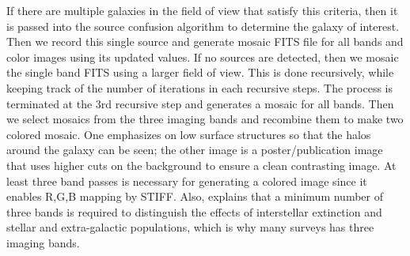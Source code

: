 \documentclass[authoryear, 12pt,5p, times]{elsarticle}
\begin{document}
If there are multiple galaxies in the field of view that satisfy this criteria, then it is passed into the source confusion algorithm to determine the galaxy of interest. Then we record this single source and generate mosaic FITS file for all bands and color images using its updated values. If no sources are detected, then we mosaic the single band FITS using a larger field of view. This is done recursively, while keeping track of the number of iterations in each recursive steps. The process is terminated at the 3rd recursive step and generates a mosaic for all bands. Then we select mosaics from the three imaging bands  and recombine them to make two  colored mosaic. \label{sec:best_low}One emphasizes on low surface structures  so that the halos around the galaxy can be seen; the other image is a poster/publication image that uses higher cuts on the background to ensure a clean contrasting image. At least three band passes is necessary for generating a colored image since it enables R,G,B mapping by STIFF. Also, \citealp{2mass} explains that a minimum number of three bands  is required to distinguish the effects of interstellar extinction and stellar and extra-galactic populations, which is why many surveys has three imaging bands.
\end{document}
